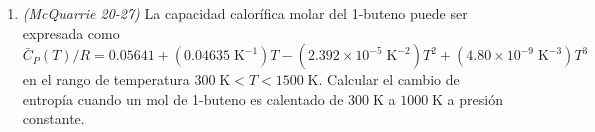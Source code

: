 \documentclass[a4paper,12pt]{article}
\begin{document}
\begin{enumerate}
 \item \textit{(McQuarrie 20-27)} La capacidad calor\'ifica molar del 1-buteno puede ser expresada como
$$\bar{C}_P(T)/R=0.05641+(0.04635\;\mbox{K}^{-1})T-(2.392\times 10^{-5}\;\mbox{K}^{-2})T^2+(4.80\times 10^{-9}\;\mbox{K}^{-3})T^3$$
en el rango de temperatura $300\;\mbox{K}<T<1500\;\mbox{K}$. Calcular el cambio de entrop\'ia cuando un mol de 1-buteno es calentado de $300\;\mbox{K}$ a $1000\;\mbox{K}$ a presi\'on constante. %

\end{enumerate}
 
\end{document}
